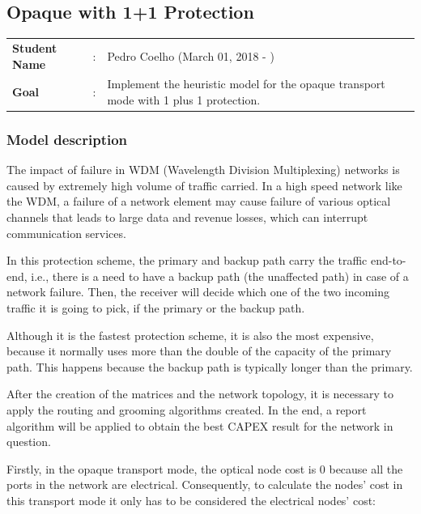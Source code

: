 \clearpage

\subsection{Opaque with 1+1 Protection}\label{heuristic_Opaque_Protection}
\begin{tcolorbox}	
\begin{tabular}{p{2.75cm} p{0.2cm} p{10.5cm}} 	
\textbf{Student Name}  &:& Pedro Coelho    (March 01, 2018 - )\\
\textbf{Goal}          &:& Implement the heuristic model for the opaque transport mode with 1 plus 1 protection.
\end{tabular}
\end{tcolorbox}

\subsubsection{Model description}

\vspace{11pt}
The impact of failure in WDM (Wavelength Division Multiplexing) networks is caused by extremely high volume of traffic carried. In a high speed network like the WDM, a failure of a network element may cause failure of various optical channels that leads to large data and revenue losses, which can interrupt communication services.

In this protection scheme, the primary and backup path carry the traffic end-to-end, i.e., there is a need to have a backup path (the unaffected path) in case of a network failure. Then, the receiver will decide which one of the two incoming traffic it is going to pick, if the primary or the backup path.

Although it is the fastest protection scheme, it is also the most expensive, because it normally uses more than the double of the capacity of the primary path. This happens because the backup path is typically longer than the primary.

After the creation of the matrices and the network topology, it is necessary to apply the routing and grooming algorithms created. In the end, a report algorithm will be applied to obtain the best CAPEX result for the network in question.

Firstly, in the opaque transport mode, the optical node cost is 0 because all the ports in the network are electrical. Consequently, to calculate the nodes' cost in this transport mode it only has to be considered the electrical nodes' cost:

